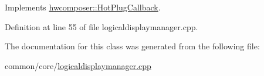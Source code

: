 Implements \mbox{\hyperlink{classhwcomposer_1_1HotPlugCallback_a455c8913e1da9b165134a05c9cb441ba}{hwcomposer\+::\+Hot\+Plug\+Callback}}.



Definition at line 55 of file logicaldisplaymanager.\+cpp.


\begin{DoxyCode}{0}
\end{DoxyCode}


The documentation for this class was generated from the following file\+:\begin{DoxyCompactItemize}
\item 
common/core/\mbox{\hyperlink{logicaldisplaymanager_8cpp}{logicaldisplaymanager.\+cpp}}\end{DoxyCompactItemize}

